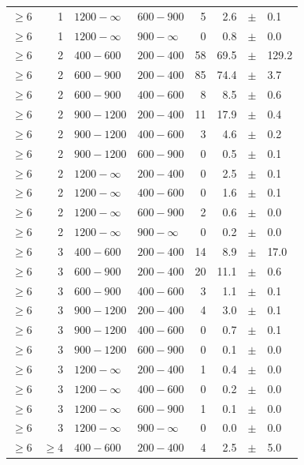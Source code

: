 \begin{table}[!h]
\begin{tabular}{rrllrrcl}
$\geq 6$ & 1 & $1200- \infty$ & $600-900$ &      5 &      2.6 &$\pm$&    0.1 \\
$\geq 6$ & 1 & $1200- \infty$ & $900-\infty$ &      0 &      0.8 &$\pm$&    0.0 \\
$\geq 6$ & 2 & $ 400- 600$ & $200-400$ &     58 &     69.5 &$\pm$&  129.2 \\
$\geq 6$ & 2 & $ 600- 900$ & $200-400$ &     85 &     74.4 &$\pm$&    3.7 \\
$\geq 6$ & 2 & $ 600- 900$ & $400-600$ &      8 &      8.5 &$\pm$&    0.6 \\
$\geq 6$ & 2 & $ 900-1200$ & $200-400$ &     11 &     17.9 &$\pm$&    0.4 \\
$\geq 6$ & 2 & $ 900-1200$ & $400-600$ &      3 &      4.6 &$\pm$&    0.2 \\
$\geq 6$ & 2 & $ 900-1200$ & $600-900$ &      0 &      0.5 &$\pm$&    0.1 \\
$\geq 6$ & 2 & $1200- \infty$ & $200-400$ &      0 &      2.5 &$\pm$&    0.1 \\
$\geq 6$ & 2 & $1200- \infty$ & $400-600$ &      0 &      1.6 &$\pm$&    0.1 \\
$\geq 6$ & 2 & $1200- \infty$ & $600-900$ &      2 &      0.6 &$\pm$&    0.0 \\
$\geq 6$ & 2 & $1200- \infty$ & $900-\infty$ &      0 &      0.2 &$\pm$&    0.0 \\
$\geq 6$ & 3 & $ 400- 600$ & $200-400$ &     14 &      8.9 &$\pm$&   17.0 \\
$\geq 6$ & 3 & $ 600- 900$ & $200-400$ &     20 &     11.1 &$\pm$&    0.6 \\
$\geq 6$ & 3 & $ 600- 900$ & $400-600$ &      3 &      1.1 &$\pm$&    0.1 \\
$\geq 6$ & 3 & $ 900-1200$ & $200-400$ &      4 &      3.0 &$\pm$&    0.1 \\
$\geq 6$ & 3 & $ 900-1200$ & $400-600$ &      0 &      0.7 &$\pm$&    0.1 \\
$\geq 6$ & 3 & $ 900-1200$ & $600-900$ &      0 &      0.1 &$\pm$&    0.0 \\
$\geq 6$ & 3 & $1200- \infty$ & $200-400$ &      1 &      0.4 &$\pm$&    0.0 \\
$\geq 6$ & 3 & $1200- \infty$ & $400-600$ &      0 &      0.2 &$\pm$&    0.0 \\
$\geq 6$ & 3 & $1200- \infty$ & $600-900$ &      1 &      0.1 &$\pm$&    0.0 \\
$\geq 6$ & 3 & $1200- \infty$ & $900-\infty$ &      0 &      0.0 &$\pm$&    0.0 \\
$\geq 6$ & $\geq 4$ & $ 400- 600$ & $200-400$ &      4 &      2.5 &$\pm$&    5.0 \\
    \hline
  \end{tabular}
\end{table}

